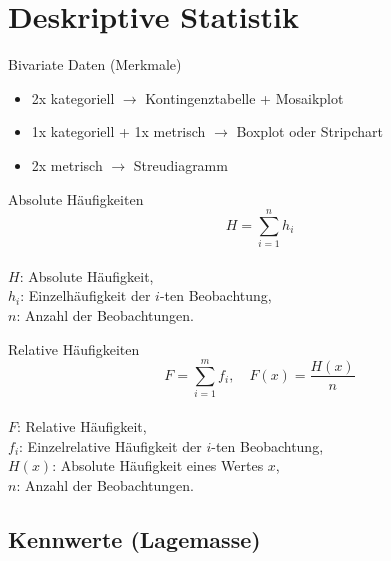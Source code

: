 \section{Deskriptive Statistik}

\begin{definition}{Bivariate Daten (Merkmale)}\\
\begin{itemize}
  \item 2x kategoriell $\rightarrow$ Kontingenztabelle + Mosaikplot
  \item 1x kategoriell + 1x metrisch $\rightarrow$ Boxplot oder Stripchart
  \item 2x metrisch $\rightarrow$ Streudiagramm
\end{itemize}
\end{definition}

\begin{minipage}{0.5\columnwidth}
\begin{definition}{Absolute Häufigkeiten}\\
$$
H=\sum_{i=1}^{n} h_{i}
$$
\\
$H$: Absolute Häufigkeit, \\
$h_{i}$: Einzelhäufigkeit der $i$-ten Beobachtung, \\
$n$: Anzahl der Beobachtungen.
\end{definition}
\end{minipage}
\begin{minipage}{0.5\columnwidth}
\begin{definition}{Relative Häufigkeiten}\\
$$
F=\sum_{i=1}^{m} f_{i}, \quad F(x)=\frac{H(x)}{n}
$$
\\
$F$: Relative Häufigkeit, \\
$f_{i}$: Einzelrelative Häufigkeit der $i$-ten Beobachtung, \\
$H(x)$: Absolute Häufigkeit eines Wertes $x$, \\
$n$: Anzahl der Beobachtungen.
\end{definition}
\end{minipage}

\subsection{Kennwerte (Lagemasse)}

